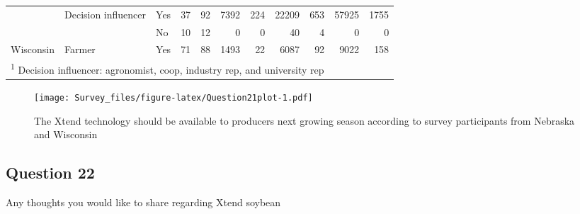 \documentclass[]{article}
\begin{document}
\begin{landscape}
\begin{table}[!h]
\begin{tabular}[t]{lllrrrrrrrr}
 & \multirow{-2}{*}{\raggedright\arraybackslash Decision influencer} & Yes & 37 & 92 & 7392 & 224 & 22209 & 653 & 57925 & 1755\\

 &  & No & 10 & 12 & 0 & 0 & 40 & 4 & 0 & 0\\

\multirow{-4}{*}{\raggedright\arraybackslash Wisconsin} & \multirow{-2}{*}{\raggedright\arraybackslash Farmer} & Yes & 71 & 88 & 1493 & 22 & 6087 & 92 & 9022 & 158\\
\bottomrule
\multicolumn{11}{l}{\textsuperscript{1} Decision influencer: agronomist, coop, industry rep, and university rep}\\
\end{tabular}
\end{table}
\end{landscape}

\begin{figure}
\centering
\texttt{[image: Survey\_files/figure-latex/Question21plot-1.pdf]}
\caption{The Xtend technology should be available to producers next
growing season according to survey participants from Nebraska and
Wisconsin}
\end{figure}

\newpage

\subsection{Question 22}\label{question-22}

Any thoughts you would like to share regarding Xtend soybean
\end{document}
